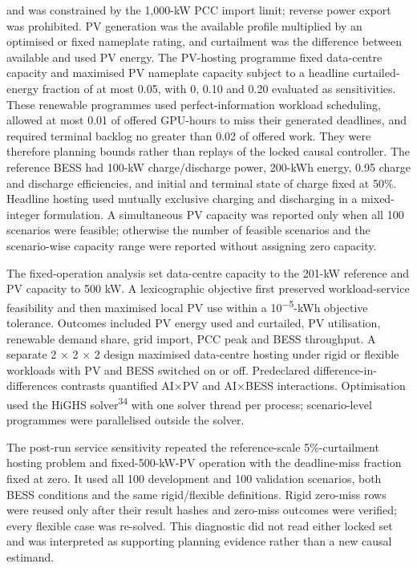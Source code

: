 \documentclass[10pt,a4paper]{article}
\begin{document}
and was constrained by the 1,000-kW PCC import limit; reverse power export was prohibited. PV generation was the available profile multiplied by an optimised or fixed nameplate rating, and curtailment was the difference between available and used PV energy. The PV-hosting programme fixed data-centre capacity and maximised PV nameplate capacity subject to a headline curtailed-energy fraction of at most 0.05, with 0, 0.10 and 0.20 evaluated as sensitivities. These renewable programmes used perfect-information workload scheduling, allowed at most 0.01 of offered GPU-hours to miss their generated deadlines, and required terminal backlog no greater than 0.02 of offered work. They were therefore planning bounds rather than replays of the locked causal controller. The reference BESS had 100-kW charge/discharge power, 200-kWh energy, 0.95 charge and discharge efficiencies, and initial and terminal state of charge fixed at 50\%. Headline hosting used mutually exclusive charging and discharging in a mixed-integer formulation. A simultaneous PV capacity was reported only when all 100 scenarios were feasible; otherwise the number of feasible scenarios and the scenario-wise capacity range were reported without assigning zero capacity.


The fixed-operation analysis set data-centre capacity to the 201-kW reference and PV capacity to 500 kW. A lexicographic objective first preserved workload-service feasibility and then maximised local PV use within a 10\textsuperscript{−5}-kWh objective tolerance. Outcomes included PV energy used and curtailed, PV utilisation, renewable demand share, grid import, PCC peak and BESS throughput. A separate 2 × 2 × 2 design maximised data-centre hosting under rigid or flexible workloads with PV and BESS switched on or off. Predeclared difference-in-differences contrasts quantified AI×PV and AI×BESS interactions. Optimisation used the HiGHS solver\textsuperscript{34} with one solver thread per process; scenario-level programmes were parallelised outside the solver.


The post-run service sensitivity repeated the reference-scale 5\%-curtailment hosting problem and fixed-500-kW-PV operation with the deadline-miss fraction fixed at zero. It used all 100 development and 100 validation scenarios, both BESS conditions and the same rigid/flexible definitions. Rigid zero-miss rows were reused only after their result hashes and zero-miss outcomes were verified; every flexible case was re-solved. This diagnostic did not read either locked set and was interpreted as supporting planning evidence rather than a new causal estimand.
\end{document}
